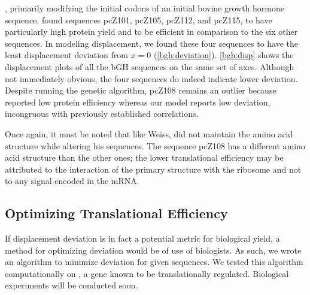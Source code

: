 \documentclass[12pt, draft]{article}
\numberwithin{equation}{section}
\begin{document}
\citet{schoner:bgh}, primarily modifying the initial codons of an
initial bovine growth hormone sequence, found sequences pcZ101,
pcZ105, pcZ112, and pcZ115, to have particularly high protein yield
and to be efficient in comparison to the six other sequences. In
modeling displacement, we found these four sequences  to have the least
displacement deviation from $x = 0$
(\autoref{bgh:deviation}). \autoref{bgh:disp} shows the displacement
plots of all the bGH sequences on the same set of axes. Although not
immediately obvious, the four sequences do indeed indicate lower
deviation. Despite running the genetic algorithm, pcZ108 remains an
outlier because \citeauthor{schoner:bgh} reported low protein
efficiency whereas our model reports low deviation, incongruous with
previously established correlations.

Once again, it must be noted that like Weiss, \citeauthor{schoner:bgh}
did not maintain the amino acid structure while altering his sequences.
The sequence pcZ108 has a different amino acid structure than the other
ones; the lower translational efficiency may be attributed to the interaction
of the primary structure with the ribosome and not to any signal encoded
in the mRNA.

\subsection{Optimizing Translational Efficiency}

If displacement deviation is in fact a potential metric for biological yield,
a method for optimizing deviation would be of use of biologists.  As such,
we wrote an algorithm to minimize deviation for given sequences.
We tested this algorithm computationally on \rpoS, a gene known to
be translationally regulated.  Biological experiments will be
conducted soon.

\end{document}

